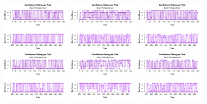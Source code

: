 \begin{figure}[th]
\centering
\includegraphics[width=0.30\textwidth]{Figures/Rating_Exp2_P1} \includegraphics[width=0.30\textwidth]{Figures/Rating_Exp2_P2} \includegraphics[width=0.30\textwidth]{Figures/Rating_Exp2_P3}
\includegraphics[width=0.30\textwidth]{Figures/Rating_Exp2_P4} \includegraphics[width=0.30\textwidth]{Figures/Rating_Exp2_P5} \includegraphics[width=0.30\textwidth]{Figures/Rating_Exp2_P6}

\end{figure}
